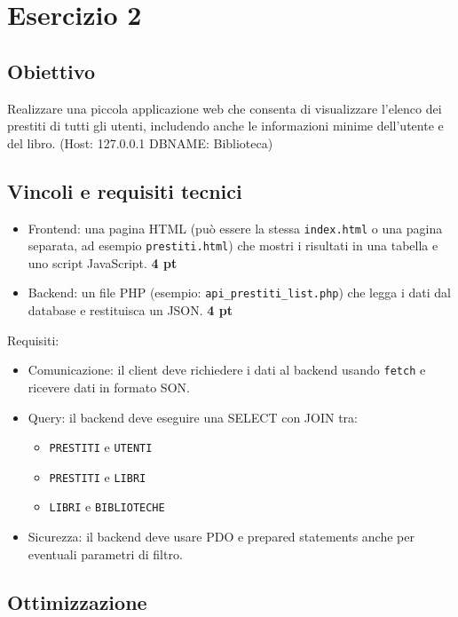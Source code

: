 \documentclass[a4paper,12pt]{article}
\begin{document}
	\section*{Esercizio 2}
	
	\subsection*{Obiettivo}
	
	Realizzare una piccola applicazione web che consenta di visualizzare l'elenco dei
	prestiti di tutti gli utenti, includendo anche le informazioni minime dell'utente
	e del libro. (Host: 127.0.0.1  DBNAME: Biblioteca)
	
	\subsection*{Vincoli e requisiti tecnici}
	
	\begin{itemize}
		\item Frontend: una pagina HTML (può essere la stessa \texttt{index.html} o
		una pagina separata, ad esempio \texttt{prestiti.html}) che mostri i
		risultati in una tabella e uno script JavaScript. \textbf{4 pt}
		\item Backend: un file PHP (esempio: \texttt{api\_prestiti\_list.php}) che
		legga i dati dal database e restituisca un JSON. \textbf{4 pt}
	\end{itemize}
	
	Requisiti:
	\begin{itemize}
		\item Comunicazione: il client deve richiedere i dati al backend usando
		\texttt{fetch} e ricevere dati in formato SON.
		\item Query: il backend deve eseguire una SELECT con JOIN tra:
		\begin{itemize}
			\item \texttt{PRESTITI} e \texttt{UTENTI}
			\item \texttt{PRESTITI} e \texttt{LIBRI}
			\item \texttt{LIBRI} e \texttt{BIBLIOTECHE}
		\end{itemize}
		\item Sicurezza: il backend deve usare PDO e prepared statements anche per
		eventuali parametri di filtro.
	\end{itemize}
	
	\subsection*{Ottimizzazione}
	
\end{document}
